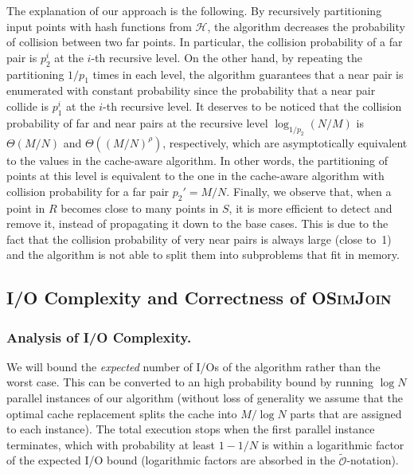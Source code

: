 \documentclass{llncs}
\newcommand{\Osymbol}{{\mathcal O}}
\newcommand{\BT}[1]{{\Theta}\left(#1\right)}
\newcommand{\SimJoin}{\textsc{OSimJoin}}
\begin{document}
The explanation of our approach is the following. 
By recursively partitioning input points with hash functions from $\mathcal H$, the algorithm decreases the probability of collision between two far points. 
In particular, the collision probability of a far pair is $p_2^i$ at the $i$-th recursive level.
On the other hand, by repeating the partitioning $1/p_1$ times in each level, the algorithm  guarantees that a near pair is enumerated with constant probability since the probability that a near pair collide is $p_1^i$ at the $i$-th recursive level.
It deserves to be noticed that the collision probability of far and near pairs at the recursive level $\log_{1/p_2} (N/M)$ is $\BT{M/N}$ and $\BT{(M/N)^\rho}$, respectively, which are asymptotically equivalent to the values in the cache-aware algorithm. 
In other words, the partitioning of points at this level is equivalent to the one in the cache-aware algorithm with collision probability for a far pair $p_2' = M/N$.
Finally, we observe that, when a point in $R$ becomes close to many points in $S$, it is more efficient to detect and remove it, instead of propagating it down to the base cases. 
This is due to the fact that the collision probability of very near pairs is always large (close to~1) and the algorithm is not able to split them into subproblems that fit in memory.







\subsection{I/O Complexity and Correctness of \SimJoin\ }\label{sec:analysisIO}

\subsubsection{Analysis of I/O Complexity.}

We will bound the \emph{expected} number of I/Os of the algorithm rather than the worst case. 
This can be converted to an high probability bound by running $\log N$ parallel instances of our algorithm 
(without loss of generality we assume that the optimal cache replacement 
splits the cache into $M/\log N$ parts that are assigned
to each instance).
The total execution stops when the first parallel instance terminates, which with probability at least 
$1 - 1/N$ is within a logarithmic factor of the expected I/O bound (logarithmic factors 
are absorbed in the $\tilde{\Osymbol}$-notation).
\end{document}
